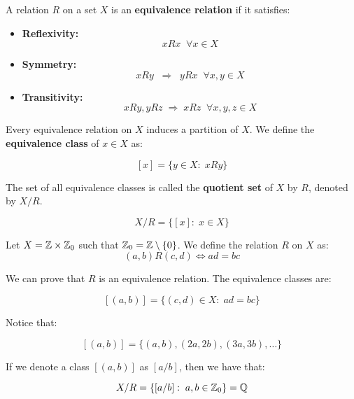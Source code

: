 \begin{fdefinition}
    A relation $R$ on a set $X$ is an \textbf{equivalence relation} if it satisfies:
    \begin{itemize}
        \item \textbf{Reflexivity:} 
        $$xRx \;\; \forall x \in X$$

        \item \textbf{Symmetry:} 
        $$xRy \;\; \Rightarrow \;\;  yRx \;\; \forall x, y \in X$$
 
        \item \textbf{Transitivity:} 
        $$xRy, yRz \; \Rightarrow \; xRz \;\; \forall x, y, z \in X$$
    \end{itemize}

    Every equivalence relation on $X$ induces a partition of $X$. We define
    the \textbf{equivalence class} of $x \in X$ as:

    $$[x] = \{y \in X: \; xRy\}$$

    The set of all equivalence classes is called the \textbf{quotient set} of $X$
    by $R$, denoted by $X/R$.

    $$X/R = \{[x]: \; x \in X\}$$
\end{fdefinition}

\begin{fexample}
    Let $X = \mathbb{Z} \times \mathbb{Z}_0$ such that $\mathbb{Z}_0 = \mathbb{Z} \setminus \{0\}$. We define
    the relation $R$ on $X$ as:
    $$(a, b)R(c, d) \iff ad = bc$$

    We can prove that $R$ is an equivalence relation. The equivalence classes
    are:

    $$[(a, b)] = \{(c, d) \in X: \; ad = bc\}$$

    Notice that:

    $$[(a, b)] = \{(a, b), (2a, 2b), (3a, 3b), \ldots\}$$

    If we denote a class $[(a, b)]$ as $[a/b]$, then we have that:

    $$X/R = \{[a/b]: \; a, b \in \mathbb{Z}_0\} = \mathbb{Q}$$

\end{fexample}